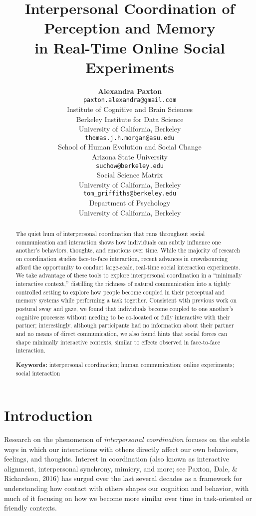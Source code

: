 \documentclass[10pt, letterpaper]{article}
\title{Interpersonal Coordination of Perception and Memory\\in Real-Time Online
Social Experiments}
\author{{\large \bf Alexandra Paxton} \\ \texttt{paxton.alexandra@gmail.com} \\ Institute of Cognitive and Brain Sciences \\ Berkeley Institute for Data Science \\ University of California, Berkeley \And {\large \bf Thomas J. H. Morgan} \\ \texttt{thomas.j.h.morgan@asu.edu} \\ School of Human Evolution and Social Change \\ Arizona State University \AND {\large \bf Jordan W. Suchow} \\ \texttt{suchow@berkeley.edu} \\ Social Science Matrix \\ University of California, Berkeley \And {\large \bf Thomas L. Griffiths} \\ \texttt{tom\_griffiths@berkeley.edu} \\ Department of Psychology \\ University of California, Berkeley}
\begin{document}
\maketitle

\begin{abstract}
The quiet hum of interpersonal coordination that runs throughout social
communication and interaction shows how individuals can subtly influence
one another's behaviors, thoughts, and emotions over time. While the
majority of research on coordination studies face-to-face interaction,
recent advances in crowdsourcing afford the opportunity to conduct
large-scale, real-time social interaction experiments. We take advantage
of these tools to explore interpersonal coordination in a ``minimally
interactive context,'' distilling the richness of natural communication
into a tightly controlled setting to explore how people become coupled
in their perceptual and memory systems while performing a task together.
Consistent with previous work on postural sway and gaze, we found that
individuals become coupled to one another's cognitive processes without
needing to be co-located or fully interactive with their partner;
interestingly, although participants had no information about their
partner and no means of direct communication, we also found hints that
social forces can shape minimally interactive contexts, similar to
effects observed in face-to-face interaction.

\textbf{Keywords:}
interpersonal coordination; human communication; online experiments;
social interaction
\end{abstract}

\section{Introduction}\label{introduction}

Research on the phenomenon of \emph{interpersonal coordination} focuses
on the subtle ways in which our interactions with others directly affect
our own behaviors, feelings, and thoughts. Interest in coordination
(also known as interactive alignment, interpersonal synchrony, mimicry,
and more; see Paxton, Dale, \& Richardson, 2016) has surged over the
last several decades as a framework for understanding how contact with
others shapes our cognition and behavior, with much of it focusing on
how we become more similar over time in task-oriented or friendly
contexts.
\end{document}
